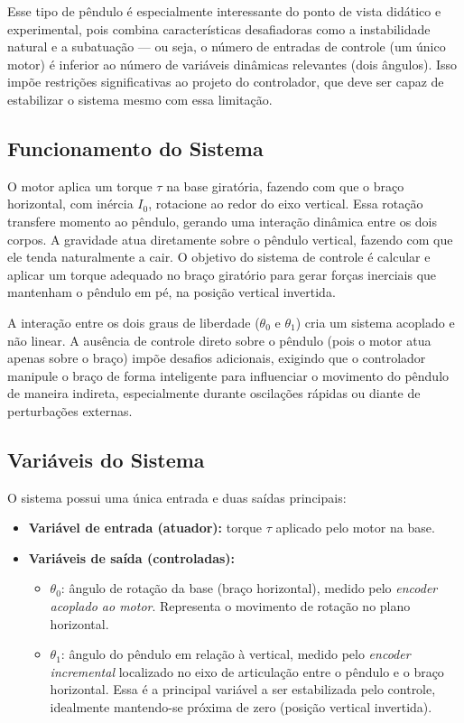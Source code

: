 \documentclass[9pt,a4paper,twocolumn,twoside]{tau-class/tau}
\begin{document}
    Esse tipo de pêndulo é especialmente interessante do ponto de vista didático e experimental, pois combina características desafiadoras como a instabilidade natural e a subatuação — ou seja, o número de entradas de controle (um único motor) é inferior ao número de variáveis dinâmicas relevantes (dois ângulos). Isso impõe restrições significativas ao projeto do controlador, que deve ser capaz de estabilizar o sistema mesmo com essa limitação.

    \subsection{Funcionamento do Sistema}
    
    O motor aplica um torque $\tau$ na base giratória, fazendo com que o braço horizontal, com inércia $I_0$, rotacione ao redor do eixo vertical. Essa rotação transfere momento ao pêndulo, gerando uma interação dinâmica entre os dois corpos. A gravidade atua diretamente sobre o pêndulo vertical, fazendo com que ele tenda naturalmente a cair. O objetivo do sistema de controle é calcular e aplicar um torque adequado no braço giratório para gerar forças inerciais que mantenham o pêndulo em pé, na posição vertical invertida.

    A interação entre os dois graus de liberdade ($\theta_0$ e $\theta_1$) cria um sistema acoplado e não linear. A ausência de controle direto sobre o pêndulo (pois o motor atua apenas sobre o braço) impõe desafios adicionais, exigindo que o controlador manipule o braço de forma inteligente para influenciar o movimento do pêndulo de maneira indireta, especialmente durante oscilações rápidas ou diante de perturbações externas.

    \subsection{Variáveis do Sistema}
    
    O sistema possui uma única entrada e duas saídas principais:
    
    \begin{itemize}
        \item \textbf{Variável de entrada (atuador):} torque $\tau$ aplicado pelo motor na base.
        \item \textbf{Variáveis de saída (controladas):}
        \begin{itemize}
        \item $\theta_0$: ângulo de rotação da base (braço horizontal), medido pelo \textit{encoder acoplado ao motor}. Representa o movimento de rotação no plano horizontal.
        \item $\theta_1$: ângulo do pêndulo em relação à vertical, medido pelo \textit{encoder incremental} localizado no eixo de articulação entre o pêndulo e o braço horizontal. Essa é a principal variável a ser estabilizada pelo controle, idealmente mantendo-se próxima de zero (posição vertical invertida).
        \end{itemize}
    \end{itemize}
\end{document}
